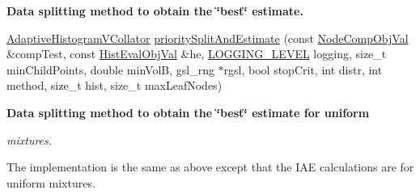 \begin{Indent}{\bf \-Data splitting method to obtain the \char`\"{}best\char`\"{} estimate.}
\begin{DoxyCompactItemize}
\hyperlink{classsubpavings_1_1AdaptiveHistogramVCollator}{\-Adaptive\-Histogram\-V\-Collator} \hyperlink{classsubpavings_1_1AdaptiveHistogramValidation_ad076189eb2565d34b8f4998eb7330827}{priority\-Split\-And\-Estimate} (const \hyperlink{classsubpavings_1_1NodeCompObjVal}{\-Node\-Comp\-Obj\-Val} \&comp\-Test, const \hyperlink{classsubpavings_1_1HistEvalObjVal}{\-Hist\-Eval\-Obj\-Val} \&he, \hyperlink{namespacesubpavings_aef8e51096b59ecaf1a1e9b2ee24b6089}{\-L\-O\-G\-G\-I\-N\-G\-\_\-\-L\-E\-V\-E\-L} logging, size\-\_\-t min\-Child\-Points, double min\-Vol\-B, gsl\-\_\-rng $\ast$rgsl, bool stop\-Crit, int distr, int method, size\-\_\-t hist, size\-\_\-t max\-Leaf\-Nodes)
\end{DoxyCompactItemize}
\end{Indent}
\begin{Indent}{\bf \-Data splitting method to obtain the \char`\"{}best\char`\"{} estimate for uniform}\par
{\em mixtures.

\-The implementation is the same as above except that the \-I\-A\-E calculations are for uniform mixtures.


}
\end{Indent}
